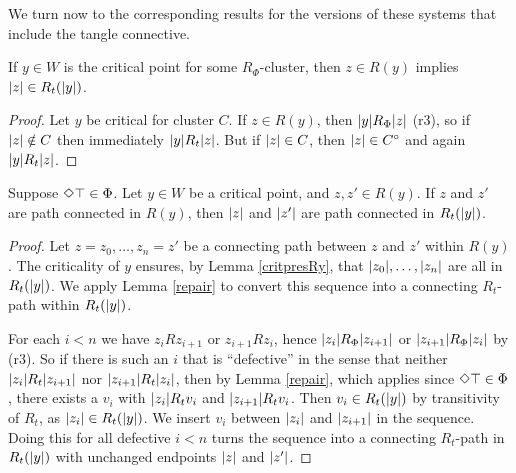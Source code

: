 We turn now to the corresponding results for the versions of these systems that include the tangle connective.
\begin{lemma}  \label{critpresRy}
If $y\in W$ is the critical point for some $R_\Phi$-cluster, then  $z\in R(y)$ implies  $|z|\in R_t(|y|)$.
\end{lemma}
\begin{proof}
Let $y$ be critical for cluster $C$. If $z\in R(y)$, then $|y|R_\Phi|z|$ (r3), so if $|z|\notin C$ then immediately $|y|R_t|z|$. But if $|z|\in C$, then $|z|\in C^\circ$ and again $|y|R_t|z|$.
\end{proof}

\begin{lemma} \label{pthconpres}
Suppose $\Diamond\top\in\Phi$.
Let $y\in W$ be a critical point, and $z,z'\in R(y)$. If $z$ and $z'$ are path connected in $R(y)$, then $|z|$ and $|z'| $ are path connected in $R_t(|y|)$.
\end{lemma}
\begin{proof}
Let $z=z_0,\dots, z_n=z'$ be a connecting path between $z$ and $z'$ within $R(y)$.
The criticality of $y$ ensures, by Lemma \ref{critpresRy}, that  $|z_0|,\dots, |z_n|$ are all in $R_t(|y|)$.
We apply Lemma \ref{repair} to convert this sequence into a connecting $R_t$-path within $R_t(|y|)$.

For each $i<n$ we have $z_iRz_{i+1}$ or $z_{i+1}Rz_{i}$, hence $|z_i|R_\Phi|z_{i+1}|$ or $|z_{i+1}|R_\Phi|z_{i}|$ by (r3). So if there is such an $i$ that is ``defective'' in the sense that neither $|z_i|R_t|z_{i+1}|$ nor $|z_{i+1}|R_t|z_{i}|$, then by Lemma \ref{repair}, which applies since $\Diamond\top\in\Phi$, there exists a $v_i$ with  $|z_i|R_t v_i$ and  $|z_{i+1}|R_t v_i$. Then $v_i\in R_t(|y|)$ by transitivity of $R_t$, as $|z_i|\in R_t(|y|)$.
We insert $v_i$ between $|z_i|$ and $|z_{i+1}|$ in the sequence.
Doing this for all defective $i<n$
turns the sequence into a connecting $R_t$-path in $R_t(|y|)$ with unchanged  endpoints $|z|$ and $|z'| $.
\end{proof}


